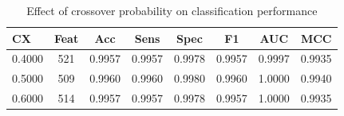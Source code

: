 \begin{table}[htbp]
\centering
\caption{Effect of crossover probability on classification performance}
\label{tab:t5_cx}
\begin{tabular}{lccccccc}
\toprule
CX & Feat & Acc & Sens & Spec & F1 & AUC & MCC \\
\midrule
0.4000 & 521 & 0.9957 & 0.9957 & 0.9978 & 0.9957 & 0.9997 & 0.9935 \\
0.5000 & 509 & 0.9960 & 0.9960 & 0.9980 & 0.9960 & 1.0000 & 0.9940 \\
0.6000 & 514 & 0.9957 & 0.9957 & 0.9978 & 0.9957 & 1.0000 & 0.9935 \\
\bottomrule
\end{tabular}
\end{table}